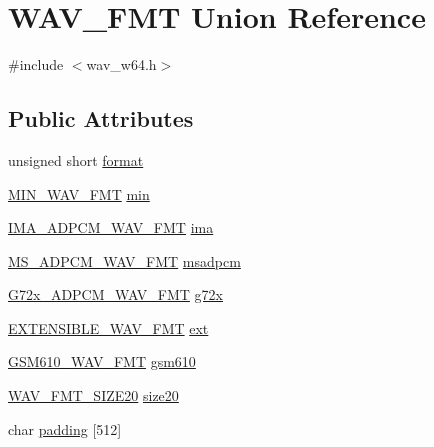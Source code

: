 \hypertarget{union_w_a_v___f_m_t}{}\section{W\+A\+V\+\_\+\+F\+MT Union Reference}
\label{union_w_a_v___f_m_t}


{\ttfamily \#include $<$wav\+\_\+w64.\+h$>$}

\subsection*{Public Attributes}
\begin{DoxyCompactItemize}
\item 
unsigned short \hyperlink{union_w_a_v___f_m_t_a58b72a657d4a1188f5b94cd3a864d3c3}{format}
\item 
\hyperlink{struct_m_i_n___w_a_v___f_m_t}{M\+I\+N\+\_\+\+W\+A\+V\+\_\+\+F\+MT} \hyperlink{union_w_a_v___f_m_t_afb3e6dd7d43c929d9740e40d947abffe}{min}
\item 
\hyperlink{struct_i_m_a___a_d_p_c_m___w_a_v___f_m_t}{I\+M\+A\+\_\+\+A\+D\+P\+C\+M\+\_\+\+W\+A\+V\+\_\+\+F\+MT} \hyperlink{union_w_a_v___f_m_t_af94d3e9c25dc75934173418ece655cdc}{ima}
\item 
\hyperlink{struct_m_s___a_d_p_c_m___w_a_v___f_m_t}{M\+S\+\_\+\+A\+D\+P\+C\+M\+\_\+\+W\+A\+V\+\_\+\+F\+MT} \hyperlink{union_w_a_v___f_m_t_a819de45b8d1ffe8f331d0f86f0a87798}{msadpcm}
\item 
\hyperlink{struct_g72x___a_d_p_c_m___w_a_v___f_m_t}{G72x\+\_\+\+A\+D\+P\+C\+M\+\_\+\+W\+A\+V\+\_\+\+F\+MT} \hyperlink{union_w_a_v___f_m_t_accc821dcba883b6a0df0eccff1f0b74b}{g72x}
\item 
\hyperlink{struct_e_x_t_e_n_s_i_b_l_e___w_a_v___f_m_t}{E\+X\+T\+E\+N\+S\+I\+B\+L\+E\+\_\+\+W\+A\+V\+\_\+\+F\+MT} \hyperlink{union_w_a_v___f_m_t_a1c175cc88ca1d2fb62159ea4d042414f}{ext}
\item 
\hyperlink{struct_g_s_m610___w_a_v___f_m_t}{G\+S\+M610\+\_\+\+W\+A\+V\+\_\+\+F\+MT} \hyperlink{union_w_a_v___f_m_t_a5adbfda640c2d09950caa8420be042c8}{gsm610}
\item 
\hyperlink{struct_w_a_v___f_m_t___s_i_z_e20}{W\+A\+V\+\_\+\+F\+M\+T\+\_\+\+S\+I\+Z\+E20} \hyperlink{union_w_a_v___f_m_t_aa88961cd21455e36b9d20df708be2832}{size20}
\item 
char \hyperlink{union_w_a_v___f_m_t_ad2e0b84ff76b1a86e72dcd8357b744ad}{padding} \mbox{[}512\mbox{]}
\end{DoxyCompactItemize}


